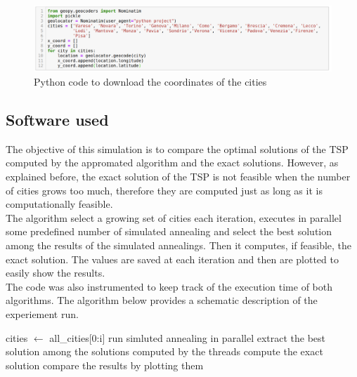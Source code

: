 \documentclass{article}
\begin{document}
\begin{figure}[H]
\includegraphics[scale=0.42]{download_dataset.png} 
\centering
\caption{Python code to download the coordinates of the cities}
\end{figure}

\subsection{Software used}
The objective of this simulation is to compare the optimal solutions of the TSP computed by the appromated algorithm and the exact solutions.
However, as explained before, the exact solution of the TSP is not feasible when the number of cities grows too much, therefore they are computed just as long as it is computationally feasible. \\
The algorithm select a growing set of cities each iteration, executes in parallel some predefined number of simulated annealing and select the best solution among the results of the simulated annealings. Then it computes, if feasible, the exact solution. The values are saved at each iteration and then are plotted to easily show the results.\\
The code was also instrumented to keep track of the execution time of both algorithms.
The algorithm  below provides a schematic description of the experiement run. 
\begin{algorithm}[H]
    \begin{algorithmic}[1]
       	\State  cities $\leftarrow$ all\_cities[0:i]
       		\State run simluted annealing in parallel
       	\EndFor 
       	\State extract the best solution among the solutions computed by the threads
       		\State compute the exact solution
       	\EndIf
       	\State compare the results by plotting them
       \EndFor
       \EndFunction
\end{algorithmic}
\end{algorithm}
\end{document}
